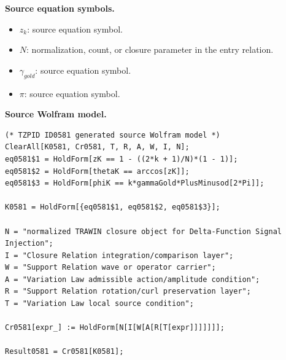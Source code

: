 \begin{minipage}[t]{0.49\linewidth}
\begingroup
\small
\raggedright
\textbf{Source equation symbols.}\par
\begin{itemize}[leftmargin=1.35em,itemsep=1pt,topsep=1pt,parsep=0pt]
    \item $z_k$: source equation symbol.
    \item $N$: normalization, count, or closure parameter in the entry relation.
    \item $\gamma_{gold}$: source equation symbol.
    \item $\pi$: source equation symbol.
\end{itemize}
\endgroup
\end{minipage}\hfill
\begin{minipage}[t]{0.47\linewidth}
\begingroup
\scriptsize
\raggedright
\textbf{Source Wolfram model.}\par
\begin{Verbatim}[fontsize=\tiny,breaklines=true,breakanywhere=true]
(* TZPID ID0581 generated source Wolfram model *)
ClearAll[K0581, Cr0581, T, R, A, W, I, N];
eq0581$1 = HoldForm[zK == 1 - ((2*k + 1)/N)*(1 - 1)];
eq0581$2 = HoldForm[thetaK == arccos[zK]];
eq0581$3 = HoldForm[phiK == k*gammaGold*PlusMinusod[2*Pi]];

K0581 = HoldForm[{eq0581$1, eq0581$2, eq0581$3}];

N = "normalized TRAWIN closure object for Delta-Function Signal Injection";
I = "Closure Relation integration/comparison layer";
W = "Support Relation wave or operator carrier";
A = "Variation Law admissible action/amplitude condition";
R = "Support Relation rotation/curl preservation layer";
T = "Variation Law local source condition";

Cr0581[expr_] := HoldForm[N[I[W[A[R[T[expr]]]]]]];

Result0581 = Cr0581[K0581];
\end{Verbatim}
\endgroup
\end{minipage}

